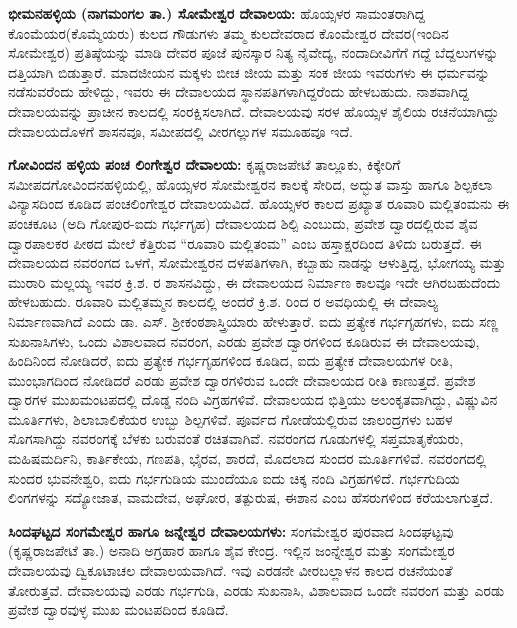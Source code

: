 \textbf{ಭೀಮನಹಳ್ಳಿಯ (ನಾಗಮಂಗಲ ತಾ.) ಸೋಮೇಶ್ವರ ದೇವಾಲಯ:} ಹೊಯ್ಸಳರ ಸಾಮಂತರಾಗಿದ್ದ ಕೊಂಮೆಯರ\-(ಕೊಮ್ಮೆಯರು) ಕುಲದ ಗೌಡುಗಳು ತಮ್ಮ ಕುಲದೇವರಾದ ಕೊಂಮೇಶ್ವರ ದೇವರ(ಇಂದಿನ ಸೋಮೇಶ್ವರ) ಪ್ರತಿಷ್ಠೆಯನ್ನು ಮಾಡಿ ದೇವರ ಪೂಜೆ ಪುನಸ್ಕಾರ ನಿತ್ಯ ನೈವೇದ್ಯ, ನಂದಾದೀವಿಗೆಗೆ ಗದ್ದೆ ಬೆದ್ದಲುಗಳನ್ನು ದತ್ತಿಯಾಗಿ ಬಿಡುತ್ತಾರೆ. ಮಾದಜೀಯನ ಮಕ್ಕಳು ಬೀಚ ಜೀಯ ಮತ್ತು ಸಂಕ ಜೀಯ ಇವರುಗಳು ಈ ಧರ್ಮವನ್ನು ನಡೆಸುವರೆಂದು ಹೇಳಿದ್ದು, ಇವರು ಈ ದೇವಾಲಯದ ಸ್ಥಾನಪತಿಗಳಾಗಿದ್ದರೆಂದು ಹೇಳಬಹುದು. ನಾಶವಾಗಿದ್ದ ದೇವಾಲಯವನ್ನು ಪ್ರಾಚೀನ ಕಾಲದಲ್ಲಿ ಸಂರಕ್ಷಿಸಲಾಗಿದೆ. ದೇವಾಲಯವು ಸರಳ ಹೊಯ್ಸಳ ಶೈಲಿಯ ರಚನೆಯಾಗಿದ್ದು ದೇವಾಲಯದೊಳಗೆ ಶಾಸನವೂ, ಸಮೀಪದಲ್ಲಿ ವೀರಗಲ್ಲುಗಳ ಸಮೂಹವೂ ಇದೆ.

\textbf{ಗೋವಿಂದನ ಹಳ್ಳಿಯ ಪಂಚ ಲಿಂಗೇಶ್ವರ ದೇವಾಲಯ:} ಕೃಷ್ಣರಾಜಪೇಟೆ ತಾಲ್ಲೂಕು, ಕಿಕ್ಕೇರಿಗೆ ಸಮೀಪದ\break ಗೋವಿಂದನಹಳ್ಳಿಯಲ್ಲಿ, ಹೊಯ್ಸಳರ ಸೋಮೇಶ್ವರನ ಕಾಲಕ್ಕೆ ಸೇರಿದ, ಅದ್ಭುತ ವಾಸ್ತು ಹಾಗೂ ಶಿಲ್ಪಕಲಾ ವಿನ್ಯಾಸದಿಂದ ಕೂಡಿದ ಪಂಚಲಿಂಗೇಶ್ವರ ದೇವಾಲಯವಿದೆ. ಹೊಯ್ಸಳರ ಕಾಲದ ಪ್ರಖ್ಯಾತ ರೂವಾರಿ ಮಲ್ಲಿತಂಮನು ಈ ಪಂಚಕೂಟ (ಅದಿ ಗೋಪುರ-ಐದು ಗರ್ಭಗೃಹ) ದೇವಾಲಯದ ಶಿಲ್ಪಿ ಎಂಬುದು, ಪ್ರವೇಶ ದ್ವಾರದಲ್ಲಿರುವ ಶೈವ ದ್ವಾರಪಾಲಕರ ಪೀಠದ ಮೇಲೆ ಕೆತ್ತಿರುವ ``ರೂವಾರಿ ಮಲ್ಲಿತಂಮ'' ಎಂಬ ಹಸ್ತಾಕ್ಷರದಿಂದ ತಿಳಿದು ಬರುತ್ತದೆ. ಈ ದೇವಾಲಯದ ನವರಂಗದ ಒಳಗೆ, ಸೋಮೇಶ್ವರನ ದಳಪತಿಗಳಾಗಿ, ಕಬ್ಬಾಹು ನಾಡನ್ನು ಆಳುತ್ತಿದ್ದ, ಭೋಗಯ್ಯ ಮತ್ತು ಮುರಾರಿ ಮಲ್ಲಯ್ಯ ಇವರ ಕ್ರಿ.ಶ. ರ ಶಾಸನವಿದ್ದು, ಈ ದೇವಾಲಯದ ನಿರ್ಮಾಣ ಕಾಲವೂ ಇದೇ ಆಗಿರಬಹುದೆಂದು ಹೇಳಬಹುದು. ರೂವಾರಿ ಮಲ್ಲಿತಮ್ಮನ ಕಾಲದಲ್ಲಿ ಅಂದರೆ ಕ್ರಿ.ಶ.  ರಿಂದ ರ ಅವಧಿಯಲ್ಲಿ ಈ ದೇವಾಲ್ಯ ನಿರ್ಮಾಣವಾಗಿದೆ ಎಂದು ಡಾ. ಎಸ್. ಶ‍್ರೀಕಂಠಶಾಸ್ತ್ರಿಯಾರು ಹೇಳುತ್ತಾರೆ. ಐದು ಪ್ರತ್ಯೇಕ ಗರ್ಭಗೃಹಗಳು, ಐದು ಸಣ್ಣ ಸುಖನಾಸಿಗಳು, ಒಂದು ವಿಶಾಲವಾದ ನವರಂಗ, ಎರಡು ಪ್ರವೇಶ ದ್ವಾರಗಳಿಂದ ಕೂಡಿರುವ ಈ ದೇವಾಲಯವು, ಹಿಂದಿನಿಂದ ನೋಡಿದರೆ, ಐದು ಪ್ರತ್ಯೇಕ ಗರ್ಭಗೃಹಗಳಿಂದ ಕೂಡಿದ, ಐದು ಪ್ರತ್ಯೇಕ ದೇವಾಲಯಗಳ ರೀತಿ, ಮುಂಭಾಗದಿಂದ ನೋಡಿದರೆ ಎರಡು ಪ್ರವೇಶ ದ್ವಾರಗಳಿರುವ ಒಂದೇ ದೇವಾಲಯದ ರೀತಿ ಕಾಣುತ್ತದೆ. ಪ್ರವೇಶ ದ್ವಾರಗಳ ಮುಖಮಂಟಪದಲ್ಲಿ ದೊಡ್ಡ ನಂದಿ ವಿಗ್ರಹಗಳಿವೆ. ದೇವಾಲಯದ ಭಿತ್ತಿಯು ಅಲಂಕೃತವಾಗಿದ್ದು, ವಿಷ್ಣುವಿನ  ಮೂರ್ತಿಗಳು, ಶಿಲಾಬಾಲಿಕೆಯರ ಉಬ್ಬು ಶಿಲ್ಪಗಳಿವೆ. ಪೂರ್ವದ ಗೋಡೆಯಲ್ಲಿರುವ ಜಾಲಂದ್ರಗಳು ಬಹಳ ಸೊಗಸಾಗಿದ್ದು ನವರಂಗಕ್ಕೆ ಬೆಳಕು ಬರುವಂತೆ ರಚಿತವಾಗಿವೆ. ನವರಂಗದ ಗೂಡುಗಳಲ್ಲಿ ಸಪ್ತಮಾತೃಕೆಯರು, ಮಹಿಷಮರ್ದಿನಿ, ಕಾರ್ತಿಕೇಯ, ಗಣಪತಿ, ಭೈರವ, ಶಾರದೆ, ಮೊದಲಾದ ಸುಂದರ ಮೂರ್ತಿಗಳಿವೆ. ನವರಂಗದಲ್ಲಿ ಸುಂದರ ಭುವನೇಶ್ವರಿ, ಐದು ಗರ್ಭಗುಡಿಯ ಮುಂದೆಯೂ ಐದು ಚಿಕ್ಕ ನಂದಿ ವಿಗ್ರಹಗಳಿದೆ. ಗರ್ಭಗುದಿಯ ಲಿಂಗಗಳನ್ನು ಸದ್ಯೋಜಾತ, ವಾಮದೇವ, ಅಘೋರ, ತತ್ಪುರುಷ, ಈಶಾನ ಎಂಬ ಹೆಸರುಗಳಿಂದ ಕರೆಯಲಾಗುತ್ತದೆ.

\textbf{ಸಿಂದಘಟ್ಟದ ಸಂಗಮೇಶ್ವರ ಹಾಗೂ ಜನ್ನೇಶ್ವರ ದೇವಾಲಯಗಳು: } ಸಂಗಮೇಶ್ವರ ಪುರವಾದ ಸಿಂದಘಟ್ಟವು (ಕೃಷ್ಣರಾಜಪೇಟೆ ತಾ.) ಅನಾದಿ ಅಗ್ರಹಾರ ಹಾಗೂ ಶೈವ ಕೇಂದ್ರ. ಇಲ್ಲಿನ ಜಂನ್ನೇಶ್ವರ ಮತ್ತು ಸಂಗಮೇಶ್ವರ ದೇವಾಲಯವು ದ್ವಿಕೂಟಾಚಲ ದೇವಾಲಯವಾಗಿದೆ. ಇವು ಎರಡನೇ ವೀರಬಲ್ಲಾಳನ ಕಾಲದ ರಚನೆಯಂತೆ ತೋರುತ್ತವೆ. ದೇವಾಲಯವು ಎರಡು ಗರ್ಭಗುಡಿ, ಎರಡು ಸುಖನಾಸಿ, ವಿಶಾಲವಾದ ಒಂದೇ ನವರಂಗ ಮತ್ತು ಎರಡು ಪ್ರವೇಶ ದ್ವಾರವುಳ್ಳ ಮುಖ ಮಂಟಪದಿಂದ ಕೂಡಿದೆ.

